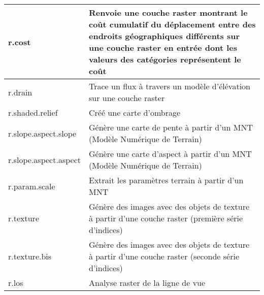 \begin{table}[H]
\begin{tabular}{|p{4cm}|p{10cm}|}
  \hline r.cost & Renvoie une couche raster montrant le coût cumulatif du déplacement entre des endroits géographiques différents sur une couche raster en entrée dont les valeurs des catégories représentent le coût\\
  \hline r.drain & Trace un flux à travers un modèle d'élévation sur une couche raster\\
  \hline r.shaded.relief & Créé une carte d'ombrage \\
  \hline r.slope.aspect.slope & Génère une carte de pente à partir d'un MNT (Modèle Numérique de Terrain) \\
  \hline r.slope.aspect.aspect & Génère une carte d'aspect à partir d'un MNT (Modèle Numérique de Terrain) \\
  \hline r.param.scale & Extrait les paramètres terrain à partir d'un MNT \\
  \hline r.texture & Génère des images avec des objets de texture à partir d'une couche raster (première série d'indices)\\
  \hline r.texture.bis & Génère des images avec des objets de texture à partir d'une couche raster (seconde série d'indices)\\
  \hline r.los & Analyse raster de la ligne de vue\\

\end{tabular}
\end{table}
